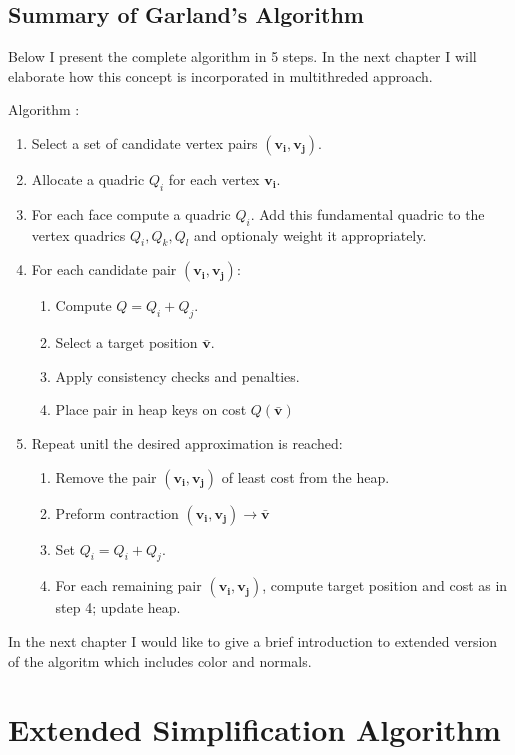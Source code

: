\newpage
\section{Summary of Garland's Algorithm}

Below I present the complete algorithm in 5 steps. In the next chapter I will elaborate how this concept is incorporated in multithreded approach.

Algorithm \cite{garland99}:

\begin{enumerate}
\item Select a set of candidate vertex pairs $(\mathbf{v_i}, \mathbf{v_j})$.
\item Allocate a quadric $Q_i$ for each vertex $\mathbf{v_i}$.
\item For each face compute a quadric $Q_i$. Add this fundamental quadric to the vertex quadrics $Q_i, Q_k, Q_l$ and optionaly weight it appropriately.
\item For each candidate pair $(\mathbf{v_i}, \mathbf{v_j})$:
\begin{enumerate}
\item Compute $Q = Q_i + Q_j$.
\item Select a target position $\mathbf{\bar{v}}$.
\item Apply consistency checks and penalties.
\item Place pair in heap keys on cost $Q(\mathbf{\bar{v}})$
\end{enumerate}
\item Repeat unitl the desired approximation is reached:
\begin{enumerate}
\item Remove the pair $(\mathbf{v_i}, \mathbf{v_j})$ of least cost from the heap.
\item Preform contraction $(\mathbf{v_i}, \mathbf{v_j})\rightarrow\bar{\mathbf{v}}$
\item Set $Q_i = Q_i + Q_j$.
\item For each remaining pair $(\mathbf{v_i}, \mathbf{v_j})$, compute target position and cost as in step 4; update heap.
\end{enumerate}
\end{enumerate}

In the next chapter I would like to give a brief introduction to extended version of the algoritm which includes color and normals.

\chapter{Extended Simplification Algorithm}

